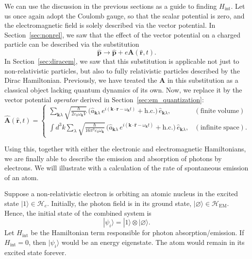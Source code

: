 \documentclass[pra,12pt]{revtex4}
\begin{document}
We can use the discussion in the previous sections as a guide to
finding $H_{\mathrm{int}}$.  Let us once again adopt the Coulomb
gauge, so that the scalar potential is zero, and the electromagnetic
field is solely described via the vector potential.  In
Section~\ref{sec:nonrel}, we saw that the effect of the vector
potential on a charged particle can be described via the substitution
\begin{equation}
  \hat{\mathbf{p}} \rightarrow \hat{\mathbf{p}} +
  e\mathbf{A}(\hat{\mathbf{r}},t).
\end{equation}
In Section~\ref{sec:diracem}, we saw that this substitution is
applicable not just to non-relativistic particles, but also to fully
relativistic particles described by the Dirac Hamiltonian.
Previously, we have treated the $\mathbf{A}$ in this substitution as a
classical object lacking quantum dynamics of its own.  Now, we replace
it by the vector potential \textit{operator} derived in
Section~\ref{sec:em_quantization}:
\begin{equation}
  \hat{\mathbf{A}}(\hat{\mathbf{r}},t) =
  \begin{cases}
    \displaystyle
    \sum_{\mathbf{k}\lambda} 
  \sqrt{\frac{\hbar}{2\varepsilon_0\omega_{\mathbf{k}}V}}\,
  \Big(\hat{a}_{\mathbf{k}\lambda} \, e^{i(\mathbf{k}\cdot\mathbf{r} - \omega_{\mathbf{k}} t)}
  + \mathrm{h.c.}\Big)\, \hat{e}_{\mathbf{k}\lambda}, & (\mathrm{finite}\;\mathrm{volume}) \\
  \displaystyle \int d^3k \sum_{\lambda} 
  \sqrt{\frac{\hbar}{16\pi^3\varepsilon_0\omega_{\mathbf{k}}}}\,
  \Big(\hat{a}_{\mathbf{k}\lambda} \, e^{i(\mathbf{k}\cdot\hat{\mathbf{r}} - \omega_{\mathbf{k}} t)}
  + \mathrm{h.c.}\Big)\, \hat{e}_{\mathbf{k}\lambda},
  & (\mathrm{infinite}\;\mathrm{space}).
  \end{cases}
  \label{Aoperator}
\end{equation}

Using this, together with either the electronic and electromagnetic
Hamiltonians, we are finally able to describe the emission and
absorption of photons by electrons.  We will illustrate with a
calculation of the rate of spontaneous emission of an atom.

Suppose a non-relativistic electron is orbiting an atomic nucleus in
the excited state $|1\rangle \in \mathscr{H}_e$.  Initially, the
photon field is in its ground state, $|\varnothing\rangle \in
\mathscr{H}_{\mathrm{EM}}$.  Hence, the initial state of the combined
system is
\begin{equation}
  |\psi_i\rangle = |1\rangle \otimes |\varnothing\rangle.
\end{equation}
Let $H_{\mathrm{int}}$ be the Hamiltonian term responsible for photon
absorption/emission.  If $H_{\mathrm{int}} = 0$, then $|\psi_i\rangle$
would be an energy eigenstate.  The atom would remain in its excited
state forever.
\end{document}
